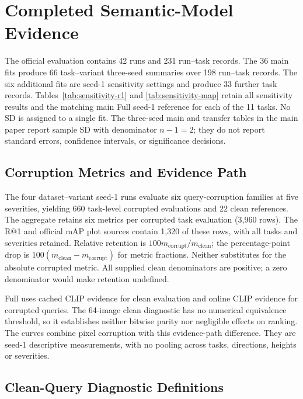 \section{Completed Semantic-Model Evidence}

The official evaluation contains 42 runs and 231 run--task records. The
36 main fits produce 66 task--variant three-seed summaries over 198
run--task records. The six additional fits are seed-1 sensitivity settings
and produce 33 further task records. Tables~\ref{tab:sensitivity-r1}
and \ref{tab:sensitivity-map} retain all sensitivity results and the
matching main Full seed-1 reference for each of the 11 tasks. No SD is
assigned to a single fit. The three-seed main and transfer tables in the
main paper report sample SD with denominator $n-1=2$; they do not report
standard errors, confidence intervals, or significance decisions.




\subsection{Corruption Metrics and Evidence Path}

The four dataset--variant seed-1 runs evaluate six query-corruption families
at five severities, yielding 660 task-level corrupted evaluations and 22
clean references. The aggregate retains six metrics per corrupted task
evaluation (3,960 rows). The R@1 and official mAP plot sources contain
1,320 of these rows, with all tasks and severities retained. Relative
retention is $100m_{\mathrm{corrupt}}/m_{\mathrm{clean}}$; the percentage-point
drop is $100(m_{\mathrm{clean}}-m_{\mathrm{corrupt}})$ for metric fractions.
Neither substitutes for the absolute corrupted metric. All supplied clean
denominators are positive; a zero denominator would make retention undefined.

Full uses cached CLIP evidence for clean evaluation and online CLIP evidence
for corrupted queries. The 64-image clean diagnostic has no numerical
equivalence threshold, so it establishes neither bitwise parity nor
negligible effects on ranking. The curves combine pixel corruption with
this evidence-path difference. They are seed-1 descriptive measurements,
with no pooling across tasks, directions, heights or severities.

\subsection{Clean-Query Diagnostic Definitions}

